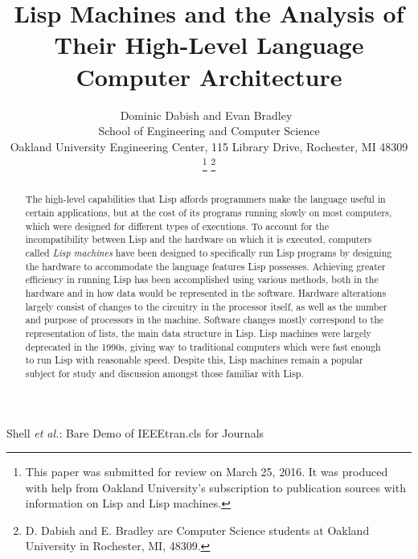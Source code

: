 \documentclass[journal]{IEEEtran}
\begin{document}
%
\title{Lisp Machines and the Analysis of Their High-Level Language Computer Architecture}

\author{
	\IEEEauthorblockN
		{
			Dominic Dabish and Evan Bradley\
		}
	\IEEEauthorblockN
		{
			\\School of Engineering and Computer Science
		}
	\IEEEauthorblockN
		{
			\\Oakland University Engineering Center, 115 Library Drive, Rochester, MI 48309
		}
\thanks{
This paper was submitted for review on March 25, 2016. It was produced with help from Oakland University's subscription to publication sources with information on Lisp and Lisp machines.
}%
\thanks{
D. Dabish and E. Bradley are Computer Science students at Oakland University in Rochester, MI, 			48309. 
}%
}

%
{Shell \MakeLowercase{\textit{et al.}}: Bare Demo of IEEEtran.cls for Journals}

\maketitle

\begin{abstract}
The high-level capabilities that Lisp affords programmers make the language useful in certain applications, but at the cost of its programs running slowly on most computers, which were designed for different types of executions. To account for the incompatibility between Lisp and the hardware on which it is executed, computers called \textit{Lisp machines} have been designed to specifically run Lisp programs by designing the hardware to accommodate the language features Lisp possesses. Achieving greater efficiency in running Lisp has been accomplished using various methods, both in the hardware and in how data would be represented in the software. Hardware alterations largely consist of changes to the circuitry in the processor itself, as well as the number and purpose of processors in the machine. Software changes mostly correspond to the representation of lists, the main data structure in Lisp. Lisp machines were largely deprecated in the 1990s, giving way to traditional computers which were fast enough to run Lisp with reasonable speed. Despite this, Lisp machines remain a popular subject for study and discussion amongst those familiar with Lisp.
\end{abstract}
\end{document}
